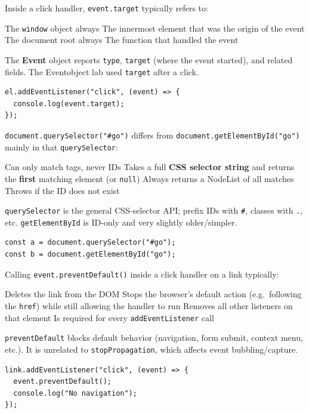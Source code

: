\newpage

\question[4]
Inside a click handler, \texttt{event.target} typically refers to:
\begin{choices}
  \choice The \texttt{window} object always
  \CorrectChoice The innermost element that was the origin of the event
  \choice The document root always
  \choice The function that handled the event
\end{choices}
\begin{solution}
  The \textbf{Event} object reports \texttt{type}, \texttt{target} (where the event started), and related fields. The Eventobject lab used \texttt{target} after a click.
\begin{lstlisting}[style=jsexam]
el.addEventListener("click", (event) => {
  console.log(event.target);
});
\end{lstlisting}
\end{solution}

\question[4]
\texttt{document.querySelector("\#go")} differs from \texttt{document.getElementById("go")} mainly in that \texttt{querySelector}:
\begin{choices}
  \choice Can only match tags, never IDs
  \CorrectChoice Takes a full \textbf{CSS selector string} and returns the \textbf{first} matching element (or \texttt{null})
  \choice Always returns a NodeList of all matches
  \choice Throws if the ID does not exist
\end{choices}
\begin{solution}
  \texttt{querySelector} is the general CSS-selector API; prefix IDs with \texttt{\#}, classes with \texttt{.}, etc. \texttt{getElementById} is ID-only and very slightly older/simpler.
\begin{lstlisting}[style=jsexam]
const a = document.querySelector("#go");
const b = document.getElementById("go");
\end{lstlisting}
\end{solution}

\question[4]
Calling \texttt{event.preventDefault()} inside a click handler on a link typically:
\begin{choices}
  \choice Deletes the link from the DOM
  \CorrectChoice Stops the browser's default action (e.g.\ following the \texttt{href}) while still allowing the handler to run
  \choice Removes all other listeners on that element
  \choice Is required for every \texttt{addEventListener} call
\end{choices}
\begin{solution}
  \texttt{preventDefault} blocks default behavior (navigation, form submit, context menu, etc.). It is unrelated to \texttt{stopPropagation}, which affects event bubbling/capture.
\begin{lstlisting}[style=jsexam]
link.addEventListener("click", (event) => {
  event.preventDefault();
  console.log("No navigation");
});
\end{lstlisting}
\end{solution}

